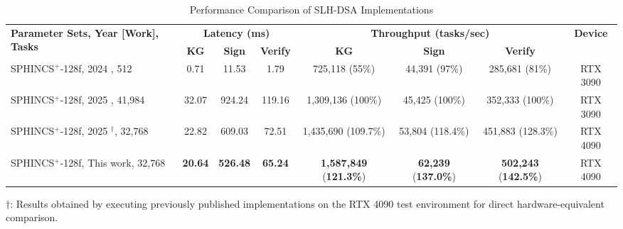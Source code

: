 \documentclass{article}
\begin{document}
\begin{table}[t]
\centering
\footnotesize
\caption{Performance Comparison of SLH-DSA Implementations}
\label{tab:performance_comparison}
\begin{tabular}{@{}l@{}c@{}c@{}c@{}c@{}c@{}c@{}c@{}}
\toprule
\multirow{2}{*}{\parbox{3.1cm}{\textbf{Parameter Sets, Year [Work], Tasks}}} & \multicolumn{3}{c}{\textbf{Latency (ms)}} & \multicolumn{3}{c}{\textbf{Throughput (tasks/sec)}} & \multirow{2}{*}{\textbf{Device}} \\
\cmidrule(lr){2-4} \cmidrule(lr){5-7}
& \textbf{KG} & \textbf{Sign} & \textbf{Verify} & \textbf{KG} & \textbf{Sign} & \textbf{Verify} & \\
\midrule
SPHINCS$^+$-128f, 2024 \cite{Kim2024}, 512  & 0.71 & 11.53 & 1.79 & 725,118 (55\%) & 44,391 (97\%) & 285,681 (81\%) & RTX 3090 \\
SPHINCS$^+$-128f, 2025 \cite{Wang2025}, 41,984 & 32.07 & 924.24 & 119.16 & 1,309,136 (100\%) & 45,425 (100\%) & 352,333 (100\%) & RTX 3090 \\
SPHINCS$^+$-128f, 2025 \cite{Wang2025}$^\dagger$, 32,768 & 22.82 & 609.03 & 72.51 & 1,435,690 (109.7\%) & 53,804 (118.4\%) & 451,883 (128.3\%) & RTX 4090 \\
SPHINCS$^+$-128f, This work, 32,768 & \textbf{20.64} & \textbf{526.48} & \textbf{65.24} & \textbf{1,587,849} (\textbf{121.3\%}) & \textbf{62,239} (\textbf{137.0\%}) & \textbf{502,243} (\textbf{142.5\%}) & RTX 4090 \\
\bottomrule
\end{tabular}
\begin{tablenotes}
\item[] $\dagger$: Results obtained by executing previously published implementations on the RTX 4090 test environment for direct hardware-equivalent comparison.
\end{tablenotes}
\end{table}

\end{document}
